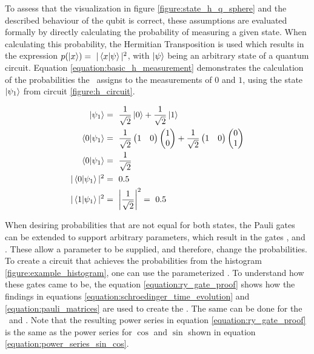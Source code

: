 To assess that the visualization in figure \ref{figure:state_h_q_sphere} and the described behaviour of the qubit is correct, these assumptions are evaluated formally by directly calculating the probability of measuring a given state. When calculating this probability, the Hermitian Transposition\cite{marshall_c_methods_1964} is used which results in the expression $p(\ket{x}) =\ |\bra{x}\ket{\psi}|^2$, with $\ket{\psi}$ being an arbitrary state of a quantum circuit. Equation \ref{equation:basic_h_measurement} demonstrates the calculation of the probabilities the \hgate\ assigns to the measurements of $0$ and $1$, using the state $\ket{\psi_1}$ from circuit \ref{figure:h_circuit}\cite{qiskit_representing_nodate}.

\begin{equation}[!h]
    \centering
    \begin{split}
        \ket{\psi_1} &=\ \frac{1}{\sqrt{2}}\ket{0} + \frac{1}{\sqrt{2}}\ket{1}\\
        \bra{0}\ket{\psi_1} &=\ \frac{1}{\sqrt{2}}\begin{pmatrix}1 & 0 \end{pmatrix}\begin{pmatrix}1 \\ 0 \end{pmatrix} + \frac{1}{\sqrt{2}}\begin{pmatrix}1 & 0 \end{pmatrix}\begin{pmatrix}0 \\ 1 \end{pmatrix} \\
        \bra{0}\ket{\psi_1} &=\ \frac{1}{\sqrt{2}}\\
        |\bra{0}\ket{\psi_1}|^2 &=\ 0.5\\
        |\bra{1}\ket{\psi_1}|^2 &=\ \left|\frac{1}{\sqrt{2}}\right|^2 =\ 0.5\\
    \end{split}
    \label{equation:basic_h_measurement}
\end{equation}

When desiring probabilities that are not equal for both states, the Pauli gates can be extended to support arbitrary parameters, which result in the gates \rygate\cite{qiskit_rygate_nodate}, \rxgate\cite{qiskit_rxgate_nodate} and \rzgate\cite{qiskit_rzgate_nodate}. These allow a parameter to be supplied, and therefore, change the probabilities. To create a circuit that achieves the probabilities from the histogram \ref{figure:example_histogram}, one can use the parameterized \rygate. To understand how these gates came to be, the equation \ref{equation:ry_gate_proof} shows how the findings in equations \ref{equation:schroedinger_time_evolution} and \ref{equation:pauli_matrices} are used to create the \rygate. The same can be done for the \rxgate\ and \rzgate. Note that the resulting power series in equation \ref{equation:ry_gate_proof} is the same as the power series for $\cos$ and $\sin$ shown in equation \ref{equation:power_series_sin_cos}\cite{lars_complex_1978}.

